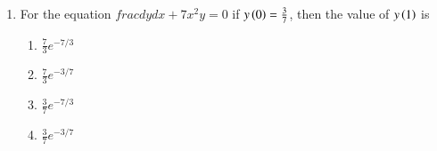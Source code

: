 \documentclass[journal,12pt,onecolumn]{IEEEtran}
\theoremstyle{remark}
\begin{document}
\begin{enumerate}
\item \label{Q3} For the equation $frac{dy}{dx} + 7x^2 y = 0$ if $y\left(0\right) = \frac{3}{7}$, then the value of $y\left(1\right)$ is
\begin{enumerate}
    \item $\frac{7}{3} e^{-7/3}$
    \item $\frac{7}{3} e^{-3/7}$
    \item $\frac{3}{7} e^{-7/3}$
    \item $\frac{3}{7} e^{-3/7}$
\end{enumerate}
    \end{enumerate}
\end{document}
